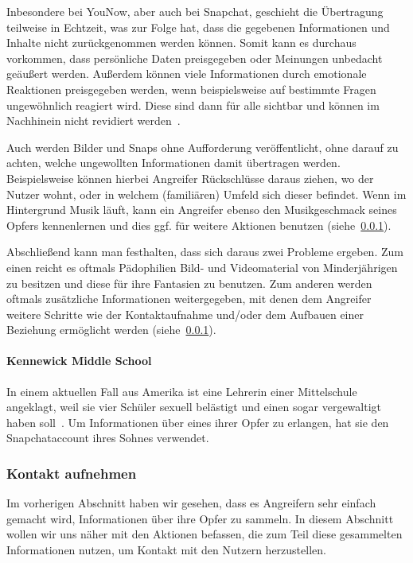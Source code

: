 Inbesondere bei YouNow, aber auch bei Snapchat, geschieht die \"Ubertragung
teilweise in Echtzeit, was zur Folge hat, dass die gegebenen Informationen und
Inhalte nicht zur\"uckgenommen werden k\"onnen. Somit kann es durchaus
vorkommen, dass pers\"onliche Daten preisgegeben oder Meinungen unbedacht
ge\"au{\ss}ert werden. Au{\ss}erdem k\"onnen viele Informationen durch
emotionale Reaktionen preisgegeben werden, wenn beispielsweise auf bestimmte
Fragen ungew\"ohnlich reagiert wird. Diese sind dann f\"ur alle sichtbar und
k\"onnen im Nachhinein nicht revidiert werden~\cite{KS15}.

Auch werden Bilder und Snaps ohne Aufforderung ver\"offentlicht, ohne darauf zu
achten, welche ungewollten Informationen damit \"ubertragen werden.
Beispielsweise k\"onnen hierbei Angreifer R\"uckschl\"usse daraus ziehen, wo
der Nutzer wohnt, oder in welchem (famili\"aren) Umfeld sich dieser befindet.
Wenn im Hintergrund Musik l\"auft, kann ein Angreifer ebenso den Musikgeschmack
seines Opfers kennenlernen und dies ggf. f\"ur weitere Aktionen benutzen
(siehe~\ref{gefahren:kinder:treffen}).

Abschlie{\ss}end kann man festhalten, dass sich daraus zwei Probleme ergeben.
Zum einen reicht es oftmals P\"adophilien Bild- und Videomaterial von
Minderj\"ahrigen zu besitzen und diese f\"ur ihre Fantasien zu benutzen. Zum
anderen werden oftmals zus\"atzliche Informationen weitergegeben, mit denen dem
Angreifer weitere Schritte wie der Kontaktaufnahme und/oder dem Aufbauen einer
Beziehung erm\"oglicht werden (siehe~\ref{gefahren:kinder:treffen}).

\paragraph{Kennewick Middle School} In einem aktuellen Fall aus Amerika ist
eine Lehrerin einer Mittelschule angeklagt, weil sie vier Sch\"uler sexuell
bel\"astigt und einen sogar vergewaltigt haben soll~\cite{tri-middle}. Um
Informationen \"uber eines ihrer Opfer zu erlangen, hat sie den Snapchataccount
ihres Sohnes verwendet.

\subsubsection{Kontakt aufnehmen}
\label{gefahren:kinder:treffen}
Im vorherigen Abschnitt haben wir gesehen, dass es Angreifern sehr einfach
gemacht wird, Informationen \"uber ihre Opfer zu sammeln. In diesem Abschnitt
wollen wir uns n\"aher mit den Aktionen befassen, die zum Teil diese
gesammelten Informationen nutzen, um Kontakt mit den Nutzern herzustellen.

